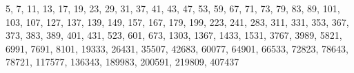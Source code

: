 5, 7, 11, 13, 17, 19, 23, 29, 31, 37, 41, 43, 47, 53, 59, 67, 71, 73, 79, 83, 89, 101, 103, 107, 127, 137, 139, 149, 157, 167, 179, 199, 223, 241, 283, 311, 331, 353, 367, 373, 383, 389, 401, 431, 523, 601, 673, 1303, 1367, 1433, 1531, 3767, 3989, 5821, 6991, 7691, 8101, 19333, 26431, 35507, 42683, 60077, 64901, 66533, 72823, 78643, 78721, 117577, 136343, 189983, 200591, 219809, 407437
